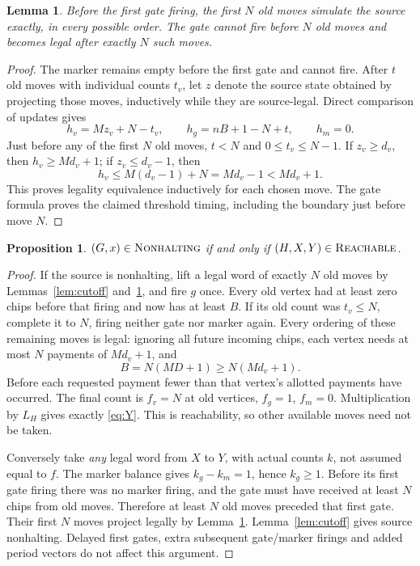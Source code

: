 \documentclass[11pt]{article}
\newtheorem{lemma}[theorem]{Lemma}
\newtheorem{proposition}[theorem]{Proposition}
\newcommand{\reach}{\textsc{Reachable}}
\newcommand{\nh}{\textsc{Nonhalting}}
\begin{document}
\begin{lemma}\label{lem:simulation}
Before the first gate firing, the first $N$ old moves simulate the
source exactly, in every possible order. The gate cannot fire before
$N$ old moves and becomes legal after exactly $N$ such moves.
\end{lemma}
\begin{proof}
The marker remains empty before the first gate and cannot fire. After
$t$ old moves with individual counts $t_v$, let $z$ denote the source
state obtained by projecting those moves, inductively while they are
source-legal. Direct comparison of updates gives
\begin{equation}\label{eq:invariant}
 h_v=Mz_v+N-t_v,\qquad h_g=nB+1-N+t,\qquad h_m=0.
\end{equation}
Just before any of the first $N$ old moves, $t<N$ and
$0\leq t_v\leq N-1$. If $z_v\geq d_v$, then
$h_v\geq Md_v+1$; if $z_v\leq d_v-1$, then
\[
 h_v\leq M(d_v-1)+N=Md_v-1<Md_v+1.
\]
This proves legality equivalence inductively for each chosen move.
The gate formula proves the claimed threshold timing, including the
boundary just before move $N$.
\end{proof}

\begin{proposition}\label{prop:equivalence}
$(G,x)\in\nh$ if and only if $(H,X,Y)\in\reach$.
\end{proposition}
\begin{proof}
If the source is nonhalting, lift a legal word of exactly $N$ old
moves by Lemmas~\ref{lem:cutoff} and~\ref{lem:simulation}, and fire
$g$ once. Every old vertex had at least zero chips before that firing
and now has at least $B$. If its old count was $t_v\leq N$, complete
it to $N$, firing neither gate nor marker again. Every ordering of
these remaining moves is legal: ignoring all future incoming chips,
each vertex needs at most $N$ payments of $Md_v+1$, and
\[
 B=N(MD+1)\geq N(Md_v+1).
\]
Before each requested payment fewer than that vertex's allotted
payments have occurred. The final count is $f_v=N$ at old vertices,
$f_g=1$, $f_m=0$. Multiplication by $L_H$ gives exactly
\eqref{eq:Y}. This is reachability, so other available moves need not
be taken.

Conversely take \emph{any} legal word from $X$ to $Y$, with actual
counts $k$, not assumed equal to $f$. The marker balance gives
$k_g-k_m=1$, hence $k_g\geq1$. Before its first gate firing there was
no marker firing, and the gate must have received at least $N$ chips
from old moves. Therefore at least $N$ old moves preceded that first
gate. Their first $N$ moves project legally by
Lemma~\ref{lem:simulation}. Lemma~\ref{lem:cutoff} gives source
nonhalting. Delayed first gates, extra subsequent gate/marker firings
and added period vectors do not affect this argument.
\end{proof}
\end{document}
